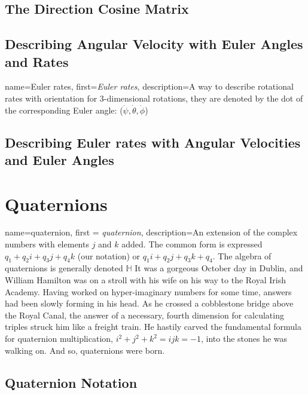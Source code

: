 \documentclass[12pt]{report}
\begin{document}
\subsection{The Direction Cosine Matrix}\label{sec:TheDCM}


\subsection{Describing Angular Velocity with Euler Angles and Rates}

{
    name=Euler rates,
    first={\textit{Euler rates}},
    description={A way to describe rotational rates with orientation for 3-dimensional rotations, they are denoted by the dot of the corresponding Euler angle: ($\dot{\psi},\dot{\theta},\dot{\phi}$)}
}



\subsection{Describing Euler rates with Angular Velocities and Euler Angles}\label{sec:DescribeEulerRates}



\section{Quaternions}\label{sec:quaternions}
{
    name=quaternion,
    first = {\textit{quaternion}},
    description={An extension of the complex numbers with elements $j$ and $k$ added. The common form is expressed $q_1+q_2i+q_3j+q_4k$ (our notation) or $q_1i+q_2j+q_3k+q_4$. The algebra of quaternions is generally denoted $\mathbb{H}$}
}
It was a gorgeous October day in Dublin, and William Hamilton was on a stroll with his wife on his way to the Royal Irish Academy. Having worked on hyper-imaginary numbers for some time, answers had been slowly forming in his head. As he crossed a cobblestone bridge above the Royal Canal, the answer of a necessary, fourth dimension for calculating triples struck him like a freight train. He hastily carved the fundamental formula for quaternion multiplication, $i^2+j^2+k^2=ijk=-1$, into the stones he was walking on. And so, \glspl{quaternion} were born.

\subsection{Quaternion Notation}
\end{document}
